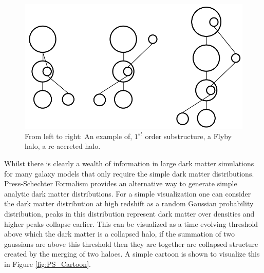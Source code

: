\begin{figure}[h]
	\centering
	\includegraphics[width = \linewidth]{Figures/Chapter1/Substructures.png}
    \caption{From left to right: An example of, $1^{st}$ order substructure, a Flyby halo, a re-accreted halo.}
	\label{fig:Substructures}
\end{figure}

Whilst there is clearly a wealth of information in large dark matter simulations for many galaxy models that only require the simple dark matter distributions. Press-Schechter Formalism \citep{Press1974} provides an alternative way to generate simple analytic dark matter distributions. For a simple visualization one can consider the dark matter distribution at high redshift as a random Gaussian probability distribution, peaks in this distribution represent dark matter over densities and higher peaks collapse earlier. This can be visualized as a time evolving threshold above which the dark matter is a collapsed halo, if the summation of two gaussians are above this threshold then they are together are collapsed structure created by the merging of two haloes. A simple cartoon is shown to visualize this in Figure \ref{fig:PS_Cartoon}.


